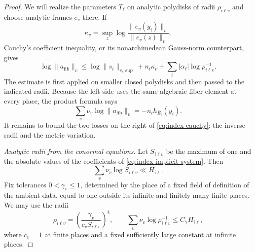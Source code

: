 \begin{proof}
We will realize the parameters $T_\ell$ on analytic polydisks of radii
$\rho_{i\ell v}$ and choose analytic frames $e_v$ there.  If
\[
 \kappa_v=\sup_z\log\frac{\|e_v(y_i)\|_v}{\|e_v(z)\|_v},
\]
Cauchy's coefficient inequality, or its nonarchimedean Gauss-norm
counterpart, gives
\begin{equation}\label{eq:index-cauchy}
 \log\|a_{\mathrm{fib}}\|_v
 \le \log\|s_i\|_{v,\sup}+n_i\kappa_v
       +\sum_\ell|\alpha_\ell|\log\rho_{i\ell v}^{-1}.
\end{equation}
The estimate is first applied on smaller closed polydisks and then
passed to the indicated radii.  Because the left side uses the same
algebraic fiber element at every place, the product formula says
\[
 \sum_v\nu_v\log\|a_{\mathrm{fib}}\|_v
       =-n_i h_{\bar E_i}(y_i).
\]
It remains to bound the two losses on the right of
\eqref{eq:index-cauchy}: the inverse radii and the metric variation.

\emph{Analytic radii from the conormal equations.}
Let $S_{i\ell v}$ be the maximum of one and the absolute values of
the coefficients of \eqref{eq:index-implicit-system}.  Then
\begin{equation}\label{eq:index-coefficient-sum}
 \sum_v\nu_v\log S_{i\ell v}\ll H_{i\ell}.
\end{equation}
Fix tolerances $0<\gamma_v\le1$, determined by the place of a fixed
field of definition of the ambient data, equal to one outside its
infinite and finitely many finite places.  We may use the radii
\begin{equation}\label{eq:index-radii}
 \rho_{i\ell v}
 =\left(\frac{\gamma_v}{c_vS_{i\ell v}}\right)^4,
 \qquad
 \sum_v\nu_v\log\rho_{i\ell v}^{-1}\le C_\gamma H_{i\ell},
\end{equation}
where $c_v=1$ at finite places and a fixed sufficiently large constant
at infinite places.


\end{proof}
